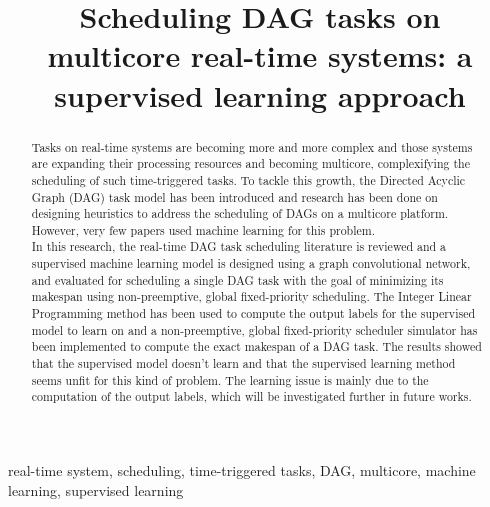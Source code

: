 \documentclass[conference]{IEEEtran}
\begin{document}
\title{Scheduling DAG tasks on multicore real-time systems: a supervised learning approach\\
}

\author{
}

\maketitle
\thispagestyle{plain}

\begin{abstract}
Tasks on real-time systems are becoming more and more complex and
those systems are expanding their processing resources and becoming multicore, complexifying
the scheduling of such time-triggered tasks.
To tackle this growth, the Directed Acyclic Graph (DAG) task model has been introduced and
research has been done on designing heuristics
to address the scheduling of DAGs on a multicore platform.
However, very few papers used machine learning for this problem.\\
In this research, the real-time DAG task scheduling literature is reviewed 
and a supervised machine learning model is designed
using a graph convolutional network, and evaluated 
for scheduling a single DAG task with the goal of minimizing its makespan 
using non-preemptive, global fixed-priority scheduling.
The Integer Linear Programming method has been 
used to compute the output labels for the supervised model to learn on
and a non-preemptive, global fixed-priority scheduler simulator 
has been implemented to compute the exact makespan of a DAG task.
The results showed that the supervised model doesn't learn
and that the supervised learning method seems unfit 
for this kind of problem.
The learning issue is mainly due to the computation of 
the output labels, which will be
investigated further in future works.
\end{abstract}

\begin{IEEEkeywords}
real-time system, scheduling, time-triggered tasks, DAG, multicore, machine learning, supervised learning
\end{IEEEkeywords}
\end{document}
